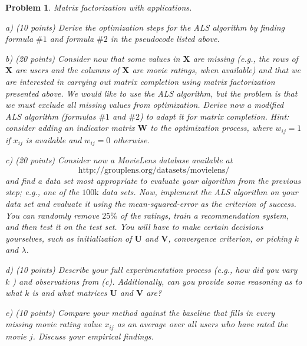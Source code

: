 \documentclass[10pt]{article}
\newtheorem{problem}{Problem}
\begin{document}
\begin{problem}
Matrix factorization with applications.

a) (10 points) Derive the optimization steps for the ALS algorithm by finding formula $\# 1$ and formula $\# 2$ in the pseudocode listed above.

b) (20 points) Consider now that some values in $\mathbf{X}$ are missing (e.g., the rows of $\mathbf{X}$ are users and the columns of $\mathbf{X}$ are movie ratings, when available) and that we are interested in carrying out matrix completion using matrix factorization presented above. We would like to use the ALS algorithm, but the problem is that we must exclude all missing values from optimization. Derive now a modified ALS algorithm (formulas $\# 1$ and $\# 2$) to adapt it for matrix completion. Hint: consider adding an indicator matrix $\mathbf{W}$ to the optimization process, where $w_{ij}=1$ if $x_{ij}$ is available and $w_{ij}=0$ otherwise.

c) (20 points) Consider now a MovieLens database available at
$$
\text{http://grouplens.org/datasets/movielens/}
$$
and find a data set most appropriate to evaluate your algorithm from the previous step; e.g., one of the $100 \mathrm{k}$ data sets. Now, implement the ALS algorithm on your data set and evaluate it using the mean-squared-error as the criterion of success. You can randomly remove $25 \%$ of the ratings, train a recommendation system, and then test it on the test set. You will have to make certain decisions yourselves, such as initialization of $\mathbf{U}$ and $\mathbf{V}$, convergence criterion, or picking $k$ and $\lambda$.

d) (10 points) Describe your full experimentation process (e.g., how did you vary $k$ ) and observations from (c). Additionally, can you provide some reasoning as to what $k$ is and what matrices $\mathbf{U}$ and $\mathbf{V}$ are?

e) (10 points) Compare your method against the baseline that fills in every missing movie rating value $x_{ij}$ as an average over all users who have rated the movie $j$. Discuss your empirical findings.\end{problem}
\end{document}
